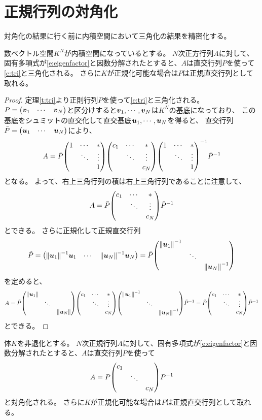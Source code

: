 \section{正規行列の対角化}

対角化の結果に行く前に内積空間において三角化の結果を精密化する。

\begin{lemma}[直交行列での三角化]
数ベクトル空間$K^N$が内積空間になっているとする。
$N$次正方行列$A$に対して、固有多項式が\eqref{e:eigenfactor}と因数分解されたとすると、$A$は直交行列$P$を使って\eqref{e:tri}と三角化される。
さらに$K$が正規化可能な場合は$P$は正規直交行列として取れる。
\end{lemma}

\begin{proof}
定理\ref{t:tri}より正則行列$P$を使って\eqref{e:tri}と三角化される。
$P = \mqty(\vb*{v}_1 & \cdots & \vb*{v}_N)$と区分けすると$\vb*{v}_1, \cdots, \vb*{v}_N$は$K^N$の基底になっており、
この基底をシュミットの直交化して直交基底$\vb*{u}_1, \cdots, \vb*{u}_N$を得ると、
直交行列$\bar{P} = \mqty(\vb*{u}_1 & \cdots & \vb*{u}_N)$により、
$$
A = \bar{P}\mqty(1 & \cdots & * \\ & \ddots & \vdots \\ & & 1)\mqty(c_1 & \cdots & * \\ & \ddots & \vdots \\ & & c_N)\mqty(1 & \cdots & * \\ & \ddots & \vdots \\ & & 1)^{-1}\bar{P}^{-1}
$$
となる。
よって、右上三角行列の積は右上三角行列であることに注意して、
$$
A = \bar{P}\mqty(c_1 & \cdots & * \\ & \ddots & \vdots \\ & & c_N)\bar{P}^{-1}
$$
とできる。
さらに正規化して正規直交行列
$$
\tilde{P}
= \mqty(\norm{\vb*{u}_1}^{-1}\vb*{u}_1 & \cdots & \norm{\vb*{u}_N}^{-1}\vb*{u}_N)
= \bar{P}\mqty(\dmat{\norm{\vb*{u}_1}^{-1}, \ddots, \norm{\vb*{u}_N}^{-1}})
$$
を定めると、
$$
A
= \tilde{P}\mqty(\dmat{\norm{\vb*{u}_1}, \ddots, \norm{\vb*{u}_N}})\mqty(c_1 & \cdots & * \\ & \ddots & \vdots \\ & & c_N)\mqty(\dmat{\norm{\vb*{u}_1}^{-1}, \ddots, \norm{\vb*{u}_N}^{-1}})\tilde{P}^{-1}
= \tilde{P}\mqty(c_1 & \cdots & * \\ & \ddots & \vdots \\ & & c_N)\tilde{P}^{-1}
$$
とできる。
\end{proof}

\begin{theorem}[正規行列の対角化]
体$K$を非退化とする。
$N$次正規行列$A$に対して、固有多項式が\eqref{e:eigenfactor}と因数分解されたとすると、$A$は直交行列$P$を使って
$$
A = P\mqty(\dmat{c_1, \ddots, c_N})P^{-1}
$$
と対角化される。
さらに$K$が正規化可能な場合は$P$は正規直交行列として取れる。
\end{theorem}

